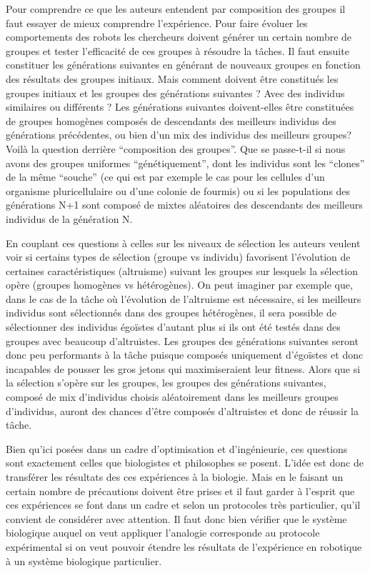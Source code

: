 \documentclass[a4paper,10pt]{article}
\begin{document}
Pour comprendre ce que les auteurs entendent par composition des groupes il faut essayer de mieux comprendre l'expérience. Pour faire évoluer les comportements des robots les chercheurs doivent générer un certain nombre de groupes et tester l'efficacité de ces groupes à résoudre la tâches. Il faut ensuite constituer les générations suivantes en générant de nouveaux groupes en fonction des résultats des groupes initiaux. Mais comment doivent être constitués les groupes initiaux et les groupes des générations suivantes ? Avec des individus similaires ou différents ? Les générations suivantes doivent-elles être constituées de groupes homogènes composés de descendants des meilleurs individus des générations précédentes, ou bien d'un mix des individus des meilleurs groupes? Voilà la question derrière ``composition des groupes''. Que se passe-t-il si nous avons des groupes uniformes ``génétiquement'', dont les individus sont les ``clones'' de la même ``souche'' (ce qui est par exemple le cas pour les cellules d'un organisme pluricellulaire ou d'une colonie de fourmis) ou si les populations des générations N+1 sont composé de mixtes aléatoires des descendants des meilleurs individus de la génération N.

En couplant ces questions à celles sur les niveaux de sélection les auteurs veulent voir si certains types de sélection (groupe vs individu) favorisent l'évolution de certaines caractéristiques (altruisme) suivant les groupes sur lesquels la sélection opère (groupes homogènes vs hétérogènes). On peut imaginer par exemple que, dans le cas de la tâche où l'évolution de l'altruisme est nécessaire, si les meilleurs individus sont sélectionnés dans des groupes hétérogènes, il sera possible de sélectionner des individus égoïstes d'autant plus si ils ont été testés dans des groupes avec beaucoup d'altruistes. Les groupes des générations suivantes seront donc peu performants à la tâche puisque composés uniquement d'égoïstes et donc incapables de pousser les gros jetons qui maximiseraient leur fitness. Alors que si la sélection s'opère sur les groupes, les groupes des générations suivantes, composé de mix d'individus choisis aléatoirement dans les meilleurs groupes d'individus, auront des chances d'être composés d'altruistes et donc de réussir la tâche.

Bien qu'ici posées dans un cadre d'optimisation et d'ingénieurie, ces questions sont exactement celles que biologistes et philosophes se posent. L'idée est donc de transférer les résultats des ces expériences à la biologie. Mais en le faisant un certain nombre de précautions doivent être prises et il faut garder à l'esprit que ces expériences se font dans un cadre et selon un protocoles très particulier, qu'il convient de considérer avec attention. Il faut donc bien vérifier que le système biologique auquel on veut appliquer l'analogie corresponde au protocole expérimental si on veut pouvoir étendre les résultats de l'expérience en robotique à un système biologique particulier.  
\end{document}
